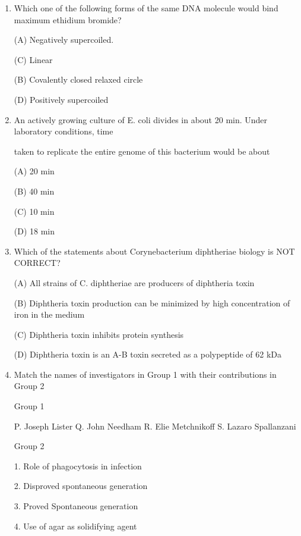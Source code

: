 \documentclass[journal]{IEEEtran}
\begin{document}
\begin{enumerate}
{(C) BNCAXPTMDOW

(D) BDQWMNCAXPT
}
\item {Which one of the following forms of the same DNA molecule would bind maximum ethidium bromide?

(A) Negatively supercoiled.

(C) Linear

(B) Covalently closed relaxed circle

(D) Positively supercoiled
}
\item {An actively growing culture of E. coli divides in about 20 min. Under laboratory conditions, time

taken to replicate the entire genome of this bacterium would be about

(A) 20 min

(B) 40 min

(C) 10 min

(D) 18 min
}
\item {Which of the statements about Corynebacterium diphtheriae biology is NOT CORRECT?

(A) All strains of C. diphtheriae are producers of diphtheria toxin

(B) Diphtheria toxin production can be minimized by high concentration of iron in the medium

(C) Diphtheria toxin inhibits protein synthesis

(D) Diphtheria toxin is an A-B toxin secreted as a polypeptide of 62 kDa
}
\item {Match the names of investigators in Group 1 with their contributions in Group 2
\begin{minipage}{0.5\textwidth}
	\begin{flushleft}


Group 1

P. Joseph Lister
Q. John Needham
R. Elie Metchnikoff
S. Lazaro Spallanzani
		\end{flushleft}
		\end{minipage}
	\begin{minipage}{0.5\textwidth}
		\begin{flushright}

Group 2

1. Role of phagocytosis in infection


2. Disproved spontaneous generation


3. Proved Spontaneous generation


4. Use of agar as solidifying agent


\end{flushright}
\end{minipage}}
\end{enumerate}
\end{document}
